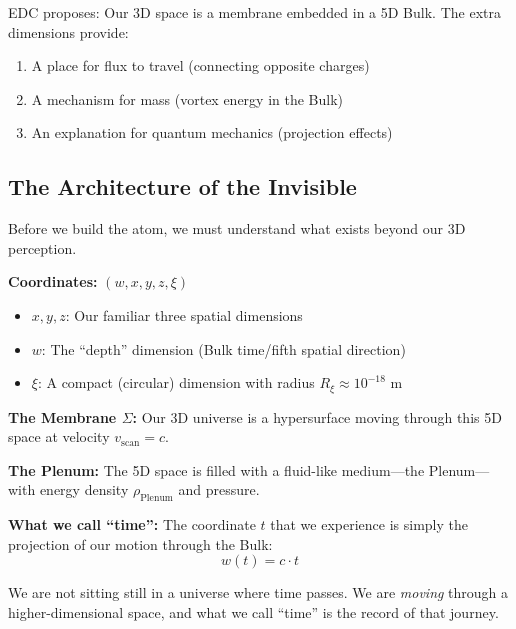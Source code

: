 EDC proposes: Our 3D space is a membrane embedded in a 5D Bulk. The extra dimensions provide:
\begin{enumerate}
    \item A place for flux to travel (connecting opposite charges)
    \item A mechanism for mass (vortex energy in the Bulk)
    \item An explanation for quantum mechanics (projection effects)
\end{enumerate}

\subsection{The Architecture of the Invisible}
\label{subsec:architecture}

Before we build the atom, we must understand what exists beyond our 3D perception.

\begin{tcolorbox}[colback=yellow!5,colframe=orange!70,title=\textbf{The Five-Dimensional Arena}]
\textbf{Coordinates:} $(w, x, y, z, \xi)$

\begin{itemize}
    \item $x, y, z$: Our familiar three spatial dimensions
    \item $w$: The ``depth'' dimension (Bulk time/fifth spatial direction)
    \item $\xi$: A compact (circular) dimension with radius $R_\xi \approx 10^{-18}$ m
\end{itemize}

\textbf{The Membrane $\Sigma$:} Our 3D universe is a hypersurface moving through this 5D space at velocity $v_{\text{scan}} = c$.

\textbf{The Plenum:} The 5D space is filled with a fluid-like medium---the Plenum---with energy density $\rho_{\text{Plenum}}$ and pressure.

\textbf{What we call ``time'':} The coordinate $t$ that we experience is simply the projection of our motion through the Bulk:
\begin{equation}
w(t) = c \cdot t
\end{equation}

We are not sitting still in a universe where time passes. We are \textit{moving} through a higher-dimensional space, and what we call ``time'' is the record of that journey.
\end{tcolorbox}

